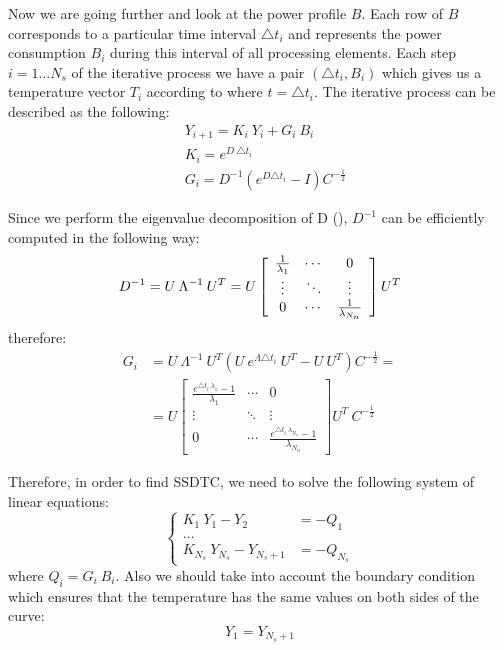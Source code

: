 Now we are going further and look at the power profile $B$. Each row of $B$ corresponds to a particular time interval $\triangle t_i$ and represents the power consumption $B_i$ during this interval of all processing elements. Each step $i = 1 \dots N_s$ of the iterative process we have a pair $(\triangle t_i, B_i)$ which gives us a temperature vector $T_i$ according to  where $t = \triangle t_i$. The iterative process can be described as the following:
\begin{align}
  & Y_{i+1} = K_i \: Y_i + G_i \: B_i \label{eq:recurrent-equation} \\
  & K_i = e^{D \: \triangle t_i} \nonumber \\
  & G_i = D^{-1} \left( e^{D \triangle t_i} - I \right) C^{-\frac{1}{2}} \nonumber
\end{align}

Since we perform the eigenvalue decomposition of D (), $D^{-1}$ can be efficiently computed in the following way:
\[
  D^{-1} = U \: \Lambda^{-1} \: U^T = U \left[
      \begin{array}{ccc}
        \frac{1}{\lambda_1} & \cdots & 0 \\
        \vdots & \ddots & \vdots \\
        0 & \cdots & \frac{1}{\lambda_{N_n}}
      \end{array}
    \right] U^T \\
\]
therefore:
\begin{align*}
  G_i & = U \: \Lambda^{-1} \: U^T \left(U \: e^{\Lambda \triangle t_i} \: U^T - U \: U^T \right) C^{-\frac{1}{2}} = \\
      & = U \left[
        \begin{array}{ccc}
          \frac{e^{\triangle t_i \: \lambda_1} - 1}{\lambda_1} & \cdots & 0 \\
          \vdots & \ddots & \vdots \\
          0 & \cdots & \frac{e^{\triangle t_i \: \lambda_{N_n}} - 1}{\lambda_{N_n}}
        \end{array}
      \right] U^T \: C^{-\frac{1}{2}}
\end{align*}

Therefore, in order to find SSDTC, we need to solve the following system of linear equations:
\[
  \begin{cases}
    K_1 \: Y_1 - Y_2 & = -Q_1 \\
    ... \\
    K_{N_s} \: Y_{N_s} - Y_{N_s + 1} & = -Q_{N_s}
  \end{cases}
\]
where $Q_i = G_i \: B_i$. Also we should take into account the boundary condition which ensures that the temperature has the same values on both sides of the curve:
\begin{equation} \label{eq:boundary-condition}
  Y_1 = Y_{N_s + 1}
\end{equation}

